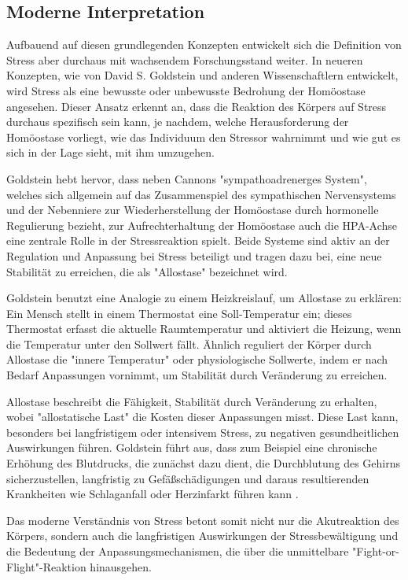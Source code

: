 \subsection{Moderne Interpretation}

Aufbauend auf diesen grundlegenden Konzepten entwickelt sich die Definition von Stress aber durchaus mit wachsendem Forschungsstand weiter. In neueren Konzepten, wie von David S. Goldstein und anderen Wissenschaftlern entwickelt, wird Stress als eine bewusste oder unbewusste Bedrohung der Homöostase angesehen. Dieser Ansatz erkennt an, dass die Reaktion des Körpers auf Stress durchaus spezifisch sein kann, je nachdem, welche Herausforderung der Homöostase vorliegt, wie das Individuum den Stressor wahrnimmt und wie gut es sich in der Lage sieht, mit ihm umzugehen.

Goldstein hebt hervor, dass neben Cannons "sympathoadrenerges System", welches sich allgemein auf das Zusammenspiel des sympathischen Nervensystems und der Nebenniere zur Wiederherstellung der Homöostase durch hormonelle Regulierung bezieht, zur Aufrechterhaltung der Homöostase auch die \ac{HPA-Achse} eine zentrale Rolle in der Stressreaktion spielt. Beide Systeme sind aktiv an der Regulation und Anpassung bei Stress beteiligt und tragen dazu bei, eine neue Stabilität zu erreichen, die als "Allostase" bezeichnet wird.

Goldstein benutzt eine Analogie zu einem Heizkreislauf, um Allostase zu erklären: Ein Mensch stellt in einem Thermostat eine Soll-Temperatur ein; dieses Thermostat erfasst die aktuelle Raumtemperatur und aktiviert die Heizung, wenn die Temperatur unter den Sollwert fällt. Ähnlich reguliert der Körper durch Allostase die "innere Temperatur" oder physiologische Sollwerte, indem er nach Bedarf Anpassungen vornimmt, um Stabilität durch Veränderung zu erreichen.

Allostase beschreibt die Fähigkeit, Stabilität durch Veränderung zu erhalten, wobei "allostatische Last" die Kosten dieser Anpassungen misst. Diese Last kann, besonders bei langfristigem oder intensivem Stress, zu negativen gesundheitlichen Auswirkungen führen. Goldstein führt aus, dass zum Beispiel eine chronische Erhöhung des Blutdrucks, die zunächst dazu dient, die Durchblutung des Gehirns sicherzustellen, langfristig zu Gefäßschädigungen und daraus resultierenden Krankheiten wie Schlaganfall oder Herzinfarkt führen kann \cite{Gold2007}.

Das moderne Verständnis von Stress betont somit nicht nur die Akutreaktion des Körpers, sondern auch die langfristigen Auswirkungen der Stressbewältigung und die Bedeutung der Anpassungsmechanismen, die über die unmittelbare "Fight-or-Flight"-Reaktion hinausgehen.

